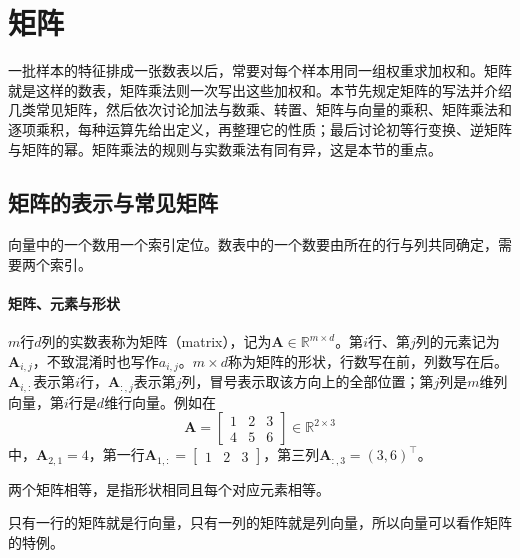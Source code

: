 
\section{矩阵}
\label{sec:ls-matrices}

一批样本的特征排成一张数表以后，常要对每个样本用同一组权重求加权和。矩阵就是这样的数表，矩阵乘法则一次写出这些加权和。本节先规定矩阵的写法并介绍几类常见矩阵，然后依次讨论加法与数乘、转置、矩阵与向量的乘积、矩阵乘法和逐项乘积，每种运算先给出定义，再整理它的性质；最后讨论初等行变换、逆矩阵与矩阵的幂。矩阵乘法的规则与实数乘法有同有异，这是本节的重点。

\subsection{矩阵的表示与常见矩阵}
\label{sec:ls-matrix-representation}

向量中的一个数用一个索引定位。数表中的一个数要由所在的行与列共同确定，需要两个索引。

\paragraph{矩阵、元素与形状}
$m$行$d$列的实数表称为矩阵（matrix），记为$\bm A\in\mathbb R^{m\times d}$。第$i$行、第$j$列的元素记为$\bm A_{i,j}$，不致混淆时也写作$a_{i,j}$。$m\times d$称为矩阵的形状，行数写在前，列数写在后。$\bm A_{i,:}$表示第$i$行，$\bm A_{:,j}$表示第$j$列，冒号表示取该方向上的全部位置；第$j$列是$m$维列向量，第$i$行是$d$维行向量。例如在
\[
 \bm A=\begin{bmatrix}1&2&3\\4&5&6\end{bmatrix}\in\mathbb R^{2\times3}
\]
中，$\bm A_{2,1}=4$，第一行$\bm A_{1,:}=\left[\begin{smallmatrix}1&2&3\end{smallmatrix}\right]$，第三列$\bm A_{:,3}=(3,6)^\top$。

两个矩阵相等，是指形状相同且每个对应元素相等。

只有一行的矩阵就是行向量，只有一列的矩阵就是列向量，所以向量可以看作矩阵的特例。

